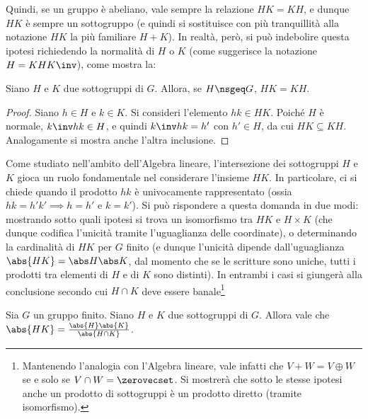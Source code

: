 \documentclass[12pt]{scrartcl}
\begin{document}
	Quindi, se un gruppo è abeliano, vale sempre la relazione
	$HK=KH$, e dunque $HK$ è sempre un sottogruppo (e quindi
	si sostituisce con più tranquillità alla notazione $HK$ la più familiare $H+K$). In realtà, però, si può indebolire questa
	ipotesi richiedendo la normalità di $H$ o $K$ (come suggerisce
	la notazione $H = KHK\inv$), come mostra la:
	
	\begin{proposition}
		Siano $H$ e $K$ due sottogruppi di $G$. Allora, se $H \nsgeq G$, $HK = KH$.
	\end{proposition}

	\begin{proof}
		Siano $h \in H$ e $k \in K$. Si consideri l'elemento
		$hk \in HK$. Poiché $H$ è normale, $k\inv h k \in H$,
		e quindi $k\inv h k = h'$ con $h' \in H$, da cui
		$HK \subseteq KH$. Analogamente si mostra anche
		l'altra inclusione.
	\end{proof} \bigskip

	Come studiato nell'ambito dell'Algebra lineare, l'intersezione dei
	sottogruppi $H$ e $K$ gioca un ruolo fondamentale nel
	considerare l'insieme $HK$. In particolare, ci si chiede
	quando il prodotto $hk$ è univocamente rappresentato
	(ossia $hk=h'k' \implies h=h'$ e $k=k'$). Si può
	rispondere a questa domanda in due modi: mostrando
	sotto quali ipotesi si trova un isomorfismo tra $HK$ e
	$H \times K$ (che dunque codifica l'unicità tramite
	l'uguaglianza delle coordinate), o determinando
	la cardinalità di $HK$ per $G$ finito (e dunque l'unicità dipende
	dall'uguaglianza $\abs{HK} = \abs H \abs K$, dal momento
	che se le scritture sono uniche, tutti i prodotti tra elementi
	di $H$ e di $K$ sono distinti). In entrambi i casi si giungerà
	alla conclusione secondo cui $H \cap K$ deve essere
	banale\footnote{Mantenendo l'analogia con l'Algebra lineare,
	vale infatti che $V + W = V \oplus W$
	se e solo se $V \cap W = \zerovecset$. Si mostrerà che
	sotto le stesse ipotesi anche un prodotto di sottogruppi è
	un prodotto diretto (tramite isomorfismo).} \bigskip


	\begin{proposition}[cardinalità di $HK$]
		Sia $G$ un gruppo finito.
		Siano $H$ e $K$ due sottogruppi di $G$. Allora vale
		che $\abs{HK} = \frac{\abs{H} \abs{K}}{\abs{H \cap K}}$.
	\end{proposition}
\end{document}
